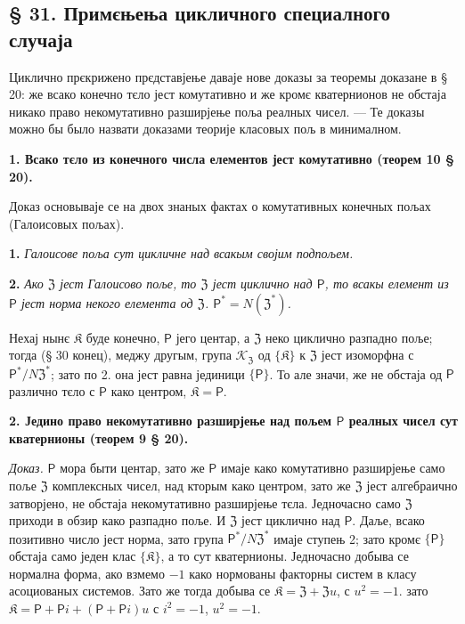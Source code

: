 \documentclass[11pt]{article}
\begin{document}
\subsection*{§ 31. Примєњења цикличного специалного случаја}\label{anwendungen-des-zyklischen-spezialfalles}

Циклично прєкрижено прєдставјење даваје нове доказы за теоремы доказане в § 20: же всако конечно тєло јест комутативно и же кромє кватернионов не обстаја никако право некомутативно разширјење поља реалных чисел. --- Те доказы можно бы было назвати доказами теорије класовых пољ в минималном.

\noindent\textbf{1. Всако тєло из конечного числа елементов јест комутативно (теорем 10 § 20).}

Доказ основываје се на двох знаных фактах о комутативных конечных пољах (Галоисовых пољах).

\noindent\textbf{1.} \emph{Галоисове поља сут цикличне над всакым својим подпољем.}

\noindent\textbf{2.} \emph{Ако \(\mathfrak Z\) јест Галоисово поље, то \(\mathfrak Z\) јест циклично над \(\mathsf{P}\), то всакы елемент из \(\mathsf{P}\) јест норма некого елемента од \(\mathfrak Z\). \(\mathsf{P}^*=N(\mathfrak Z^*)\).}

Нехај нынє \(\mathfrak K\) буде конечно, \(\mathsf{P}\) јего центар, а \(\mathfrak Z\) неко циклично разпадно поље; тогда (§ 30 конец), меджу другым, група \(\mathscr K_{\mathfrak Z}\) од \(\{\mathfrak K\}\) к \(\mathfrak Z\) јест изоморфна с \(\mathsf{P}^*/N\mathfrak Z^*\); зато по 2. она јест равна јединици \(\{\mathsf{P}\}\). То але значи, же не обстаја од \(\mathsf{P}\) различно тєло с \(\mathsf{P}\) како центром, \(\mathfrak K=\mathsf{P}\).

\noindent\textbf{2. Једино право некомутативно разширјење над пољем \(\mathsf{P}\) реалных чисел сут кватернионы (теорем 9 § 20).}

\noindent\emph{Доказ.} \(\mathsf{P}\) мора быти центар, зато же \(\mathsf{P}\) имаје како комутативно разширјење само поље \(\mathfrak Z\) комплексных чисел, над кторым како центром, зато же \(\mathfrak Z\) јест алгебраично затворјено, не обстаја некомутативно разширјење тєла. Једночасно само \(\mathfrak Z\) приходи в обзир како разпадно поље. И \(\mathfrak Z\) јест циклично над \(\mathsf{P}\). Даље, всако позитивно число јест норма, зато група \(\mathsf{P}^*/N\mathfrak Z^*\) имаје ступењ 2; зато кромє \(\{\mathsf{P}\}\) обстаја само једен клас \(\{\mathfrak K\}\), а то сут кватернионы. Једночасно добыва се нормална форма, ако взмемо \(-1\) како нормованы факторны систем в класу асоциованых системов. Зато же тогда добыва се \(\mathfrak K=\mathfrak Z+\mathfrak Zu\), с \(u^2=-1\). зато \(\mathfrak K=\mathsf P+\mathsf Pi+(\mathsf P+\mathsf Pi)u\) с \(i^2=-1\), \(u^2=-1\).
\end{document}
